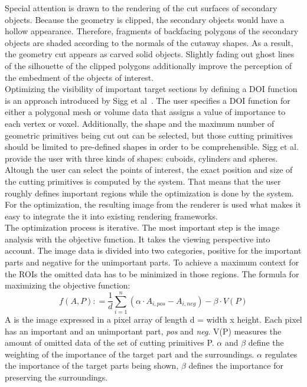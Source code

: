 Special attention is drawn to the rendering of the cut surfaces of secondary objects. Because the geometry is clipped, the secondary objects would have a hollow appearance. Therefore, fragments of backfacing polygons of the secondary objects are shaded according to the normals of the cutaway shapes. As a result, the geometry cut appears as carved solid objects. Slightly fading out ghost lines of the silhouette of the clipped polygons additionally improve the perception of the embedment of the objects of interest.\\
\newline
Optimizing the visibility of important target sections by defining a DOI function is an approach introduced by Sigg et al~\cite{proc:intelligentCutaway}. The user specifies a DOI function for either a polygonal mesh or volume data that assigns a value of importance to each vertex or voxel. Additionally, the shape and the maximum number of geometric primitives being cut out can be selected, but those cutting primitives should be limited to pre-defined shapes in order to be comprehensible. Sigg et al. provide the user with three kinds of shapes: cuboids, cylinders and spheres. Altough the user can select the points of interest, the exact position and size of the cutting primitives is computed by the system. That means that the user roughly defines important regions while the optimization is done by the system. For the optimization, the resulting image from the renderer is used what makes it easy to integrate the it into existing rendering frameworks.\\
The optimization process is iterative. The most important step is the image analysis with the objective function. It takes the viewing perspective into account. The image data is divided into two categories, positive for the important parts and negative for the unimportant parts. To achieve a maximum context for the ROIs the omitted data has to be minimized in those regions. The formula for maximizing the objective function:\\
\begin{equation}
f(A, P) \colon= \frac{1}{d} \sum^n_{i=1} (\alpha\cdot A_{i,pos} - A_{i,neg}) - \beta\cdot V(P)
\label{eq: bla}
\end{equation}
A is the image expressed in a pixel array of length d = width x height. Each pixel has an important and an unimportant part, \emph{pos} and \emph{neg}. V(P) measures the amount of omitted data of the set of cutting primitives P. $\alpha$ and $\beta$ define the weighting of the importance of the target part and the surroundings. $\alpha$ regulates the importance of the target parts being shown, $\beta$ defines the importance for preserving the surroundings.\\
